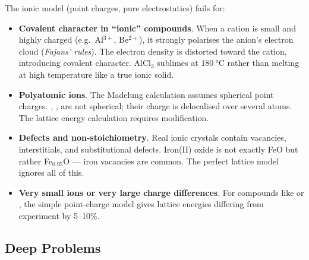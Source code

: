 \documentclass[12pt, a4paper]{book}
\newcommand{\newterm}[1]{\textit{\textcolor{DiscoveryColor}{#1}}}
\begin{document}
\begin{modelbreaks}
The ionic model (point charges, pure electrostatics) fails for:

\begin{itemize}[nosep, leftmargin=2em]
  \item \textbf{Covalent character in ``ionic'' compounds}.
        When a cation is small and highly charged
        (e.g.\ Al$^{3+}$, Be$^{2+}$), it strongly polarises
        the anion's electron cloud (\newterm{Fajans' rules}).
        The electron density is distorted toward the cation,
        introducing covalent character.
        AlCl$_3$ sublimes at $\SI{180}{\degreeCelsius}$ rather
        than melting at high temperature like a true ionic solid.

  \item \textbf{Polyatomic ions}.
        The Madelung calculation assumes spherical point charges.
        , ,  are not
        spherical; their charge is delocalised over several atoms.
        The lattice energy calculation requires modification.

  \item \textbf{Defects and non-stoichiometry}.
        Real ionic crystals contain vacancies, interstitials,
        and substitutional defects.
        Iron(II) oxide is not exactly FeO but rather
        Fe$_{0.95}$O --- iron vacancies are common.
        The perfect lattice model ignores all of this.

  \item \textbf{Very small ions or very large charge differences}.
        For compounds like  or ,
        the simple point-charge model gives lattice energies
        differing from experiment by 5--10\%.
\end{itemize}
\end{modelbreaks}

\subsection*{Deep Problems}
\end{document}
